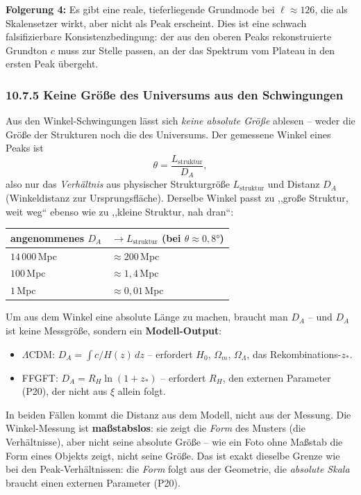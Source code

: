 \textbf{Folgerung 4:} Es gibt eine reale, tieferliegende Grundmode bei
$\ell \approx 126$, die als Skalensetzer wirkt, aber nicht als Peak
erscheint. Dies ist eine schwach
falsifizierbare Konsistenzbedingung: der aus den oberen Peaks
rekonstruierte Grundton $c$ muss zur Stelle passen, an der das Spektrum
vom Plateau in den ersten Peak übergeht.

\subsubsection*{10.7.5 Keine Größe des Universums aus den Schwingungen}

Aus den Winkel-Schwingungen lässt sich \emph{keine absolute Größe}
ablesen -- weder die Größe der Strukturen noch die des Universums.
Der gemessene Winkel eines Peaks ist
\[
  \theta = \frac{L_\mathrm{struktur}}{D_A},
\]
also nur das \emph{Verhältnis} aus physischer Strukturgröße
$L_\mathrm{struktur}$ und Distanz $D_A$ (Winkeldistanz zur
Ursprungsfläche). Derselbe Winkel passt zu ,,große Struktur, weit weg``
ebenso wie zu ,,kleine Struktur, nah dran``:

\begin{center}
\begin{tabular}{p{4cm}p{4cm}}
\toprule
\textbf{angenommenes $D_A$} & \textbf{$\to L_\mathrm{struktur}$ (bei $\theta\approx0{,}8°$)} \\
\midrule
$14\,000$\,Mpc & $\approx 200$\,Mpc \\
$100$\,Mpc & $\approx 1{,}4$\,Mpc \\
$1$\,Mpc & $\approx 0{,}01$\,Mpc \\
\bottomrule
\end{tabular}
\end{center}

Um aus dem Winkel eine absolute Länge zu machen, braucht man $D_A$ --
und $D_A$ ist keine Messgröße, sondern ein \textbf{Modell-Output}:
\begin{itemize}
  \item $\Lambda$CDM: $D_A = \int c/H(z)\,dz$ -- erfordert $H_0$,
        $\Omega_m$, $\Omega_\Lambda$, das Rekombinations-$z_*$.
  \item FFGFT: $D_A = R_H\ln(1+z_*)$ -- erfordert $R_H$, den externen
        Parameter (P20), der nicht aus $\xi$ allein folgt.
\end{itemize}

In beiden Fällen kommt die Distanz aus dem Modell, nicht aus der
Messung. Die Winkel-Messung ist \textbf{maßstabslos}: sie zeigt die
\emph{Form} des Musters (die Verhältnisse), aber nicht seine absolute
Größe -- wie ein Foto ohne Maßstab die Form eines Objekts zeigt, nicht
seine Größe. Das ist exakt dieselbe Grenze wie bei den
Peak-Verhältnissen: die \emph{Form} folgt aus der Geometrie, die
\emph{absolute Skala} braucht einen externen Parameter (P20).

